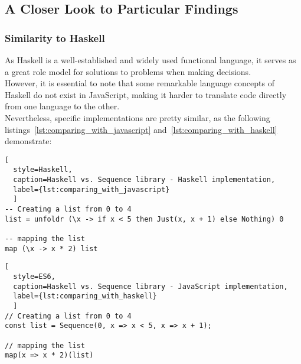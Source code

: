 \subsection{A Closer Look to Particular Findings}
\label{sub:A Closer Look to Particular Findings}

\subsubsection{Similarity to Haskell}
\label{subsub:Similarity to Haskell}
As Haskell is a well-established and widely used functional language, it serves
as a great role model for solutions to problems when making decisions. \\
However, it is essential to note that some remarkable language concepts of
Haskell do not exist in JavaScript, making it harder to translate code directly
from one language to the other. \\
Nevertheless, specific implementations are
pretty similar, as the following listings~\ref{lst:comparing_with_javascript}
and~\ref{lst:comparing_with_haskell} demonstrate:

\begin{lstlisting}[
  style=Haskell, 
  caption=Haskell vs. Sequence library - Haskell implementation, 
  label={lst:comparing_with_javascript}
  ]
-- Creating a list from 0 to 4
list = unfoldr (\x -> if x < 5 then Just(x, x + 1) else Nothing) 0

-- mapping the list
map (\x -> x * 2) list 
\end{lstlisting}

\begin{lstlisting}[
  style=ES6, 
  caption=Haskell vs. Sequence library - JavaScript implementation,
  label={lst:comparing_with_haskell}
  ]
// Creating a list from 0 to 4
const list = Sequence(0, x => x < 5, x => x + 1);

// mapping the list
map(x => x * 2)(list)
\end{lstlisting}
